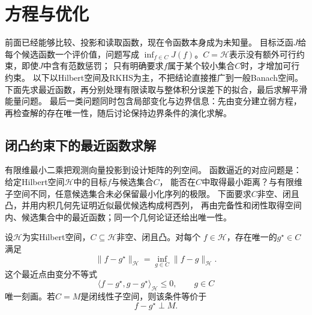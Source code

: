 \section{方程与优化}
\label{sec:functional-optimization-regularization}

前面已经能够比较、投影和读取函数，现在令函数本身成为未知量。
目标泛函$J$给每个候选函数一个评价值，问题写成
$\inf_{f\in C}J(f)$。$C=\mathcal H$表示没有额外可行约束，即使$J$中含有范数惩罚；
只有明确要求$f$属于某个较小集合$C$时，才增加可行约束。
以下以Hilbert空间及RKHS为主，不把结论直接推广到一般Banach空间。
下面先求最近函数，再分别处理有限读取与整体积分误差下的拟合，最后求解平滑能量问题。
最后一类问题同时包含局部变化与边界信息：先由变分建立弱方程，
再检查解的存在唯一性，随后讨论保持边界条件的演化求解。

\subsection{闭凸约束下的最近函数求解}
\label{sec:functional-nearest-function}

有限维最小二乘把观测向量投影到设计矩阵的列空间。
函数逼近的对应问题是：给定Hilbert空间$\mathcal H$中的目标$f$与候选集合$C$，
能否在$C$中取得最小距离？与有限维子空间不同，任意候选集合未必保留最小化序列的极限。
下面要求$C$非空、闭且凸，并用内积几何先证明近似最优候选构成柯西列，
再由完备性和闭性取得空间内、候选集合中的最近函数；同一个几何论证还给出唯一性。

\begin{theorem}[Hilbert空间投影定理]
\label{thm:functional-hilbert-projection}
设$\mathcal{H}$为实Hilbert空间，$C\subseteq\mathcal{H}$非空、闭且凸。对每个
$f\in\mathcal{H}$，存在唯一的$g^\star\in C$满足
\[
  \lVert f-g^\star\rVert_{\mathcal{H}}
  =\inf_{g\in C}\lVert f-g\rVert_{\mathcal{H}}.
\]
这个最近点由变分不等式
\begin{equation}
  \langle f-g^\star,g-g^\star\rangle_{\mathcal{H}}
  \leq0,\qquad g\in C
  \label{eq:functional-convex-projection-characterization}
\end{equation}
唯一刻画。若$C=M$是闭线性子空间，则该条件等价于
\begin{equation}
  f-g^\star\perp M.
  \label{eq:functional-subspace-projection-orthogonality}
\end{equation}
\end{theorem}

